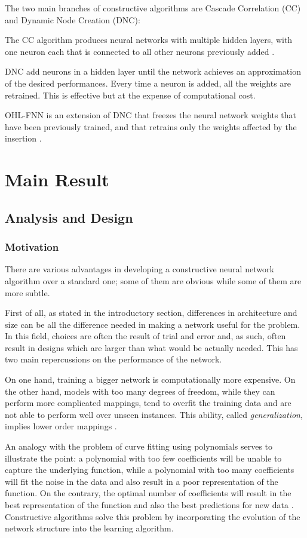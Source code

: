 \documentclass[11pt,a4paper]{report}
\begin{document}
			The two main branches of constructive algorithms are Cascade Correlation (CC) and Dynamic Node Creation (DNC):
			
			The CC algorithm produces neural networks with multiple hidden layers, with one neuron each that is connected to all other neurons previously added \cite{sharma2010constructive}.
					
			DNC add neurons in a hidden layer until the network achieves an approximation of the desired performances.
			Every time a neuron is added, all the weights are retrained. This is effective but at the expense of computational cost. \cite{sharma2010constructive}
					
			OHL-FNN is an extension of DNC that freezes the neural network weights that have been previously trained, and that retrains only the weights affected by the insertion \cite{kwok1997objective}.

	
	\chapter{Main Result}
		\section{Analysis and Design}
			\subsection{Motivation}
				There are various advantages in developing a constructive neural network algorithm over a standard one; some of them are obvious while some of them are more subtle.
				
				First of all, as stated in the introductory section, differences in architecture and size can be all the difference needed in making a network useful for the problem. In this field, choices are often the result of trial and error and, as such, often result in designs which are larger than what would be actually needed. This has two main repercussions on the performance of the network.
				
				On one hand, training a bigger network is computationally more expensive. On the other hand, models with too many degrees of freedom, while they can perform more complicated mappings, tend to overfit the training data and are not able to perform well over unseen instances. This ability, called \emph{generalization}, implies lower order mappings \cite{alpaydin1994gal}.
				
				An analogy with the problem of curve fitting using polynomials serves to illustrate the point: a polynomial with too few coefficients will be unable to capture the underlying function, while a polynomial with too many coefficients will fit the noise in the data and also result in a poor representation of the function. On the contrary, the optimal number of coefficients will result in the best representation of the function and also the best predictions for new data \cite{kwok1997objective}. Constructive algorithms solve this problem by incorporating the evolution of the network structure into the learning algorithm.
				
\end{document}
